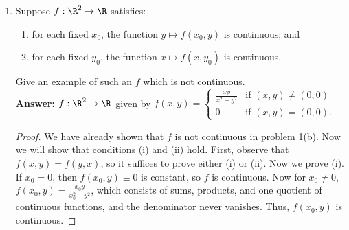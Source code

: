 \documentclass[a5paper]{article}
\theoremstyle{definition}%
\numberwithin{exercise}{section}
\theoremstyle{remark}%
\begin{document}
\begin{enumerate}
\item Suppose $f:\R^2\to \R$ satisfies:
	\begin{enumerate}[label=(\roman*)]
	\item  for each fixed $x_0$, the function $y \mapsto f(x_0, y)$ is continuous; and
	\item  for each fixed $y_0$, the function $x \mapsto f(x, y_0)$ is continuous.
	\end{enumerate}
Give an example of such an $f$ which is not continuous.\\ 
\textbf{Answer: } $f:\R^2\to \R$ given by $f(x,y)=
	\begin{cases}
	\frac{xy}{x^2+y^2} & \text{if } (x,y)\neq(0,0)\\
	0 & \text{if } (x,y)=(0,0).
	\end{cases}$
\begin{proof}
We have already shown that $f$ is not continuous in problem 1(b). Now we will show that conditions (i) and (ii) hold. First, observe that $f(x,y)=f(y,x)$, so it suffices to prove either (i) or (ii). Now we prove (i). If $x_0=0$, then $f(x_0,y)\equiv0$ is constant, so $f$ is continuous. Now for $x_0\neq0$, $f(x_0,y)=\frac{x_0y}{x_0^2+y^2}$, which consists of sums, products, and one quotient of continuous functions, and the denominator never vanishes. Thus, $f(x_0,y)$ is continuous. 
\end{proof}


\end{enumerate}
\end{document}

